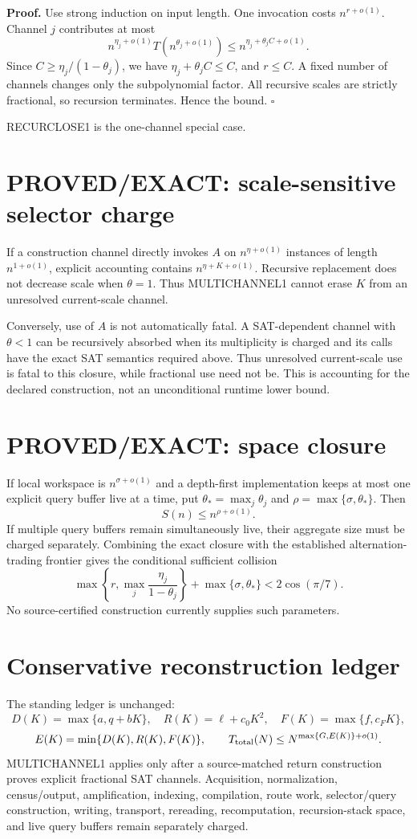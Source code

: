 \documentclass[11pt]{article}
\begin{document}
\textbf{Proof.}
Use strong induction on input length. One invocation costs \(n^{r+o(1)}\). Channel \(j\) contributes at most
\[
n^{\eta_j+o(1)}T(n^{\theta_j+o(1)})\le n^{\eta_j+\theta_j C+o(1)}.
\]
Since \(C\ge\eta_j/(1-\theta_j)\), we have \(\eta_j+\theta_jC\le C\), and \(r\le C\). A fixed number of channels changes only the subpolynomial factor. All recursive scales are strictly fractional, so recursion terminates. Hence the bound. \(\square\)

RECURCLOSE1 is the one-channel special case.

\section*{PROVED/EXACT: scale-sensitive selector charge}
If a construction channel directly invokes \(A\) on \(n^{\eta+o(1)}\) instances of length \(n^{1+o(1)}\), explicit accounting contains \(n^{\eta+K+o(1)}\). Recursive replacement does not decrease scale when \(\theta=1\). Thus MULTICHANNEL1 cannot erase \(K\) from an unresolved current-scale channel.

Conversely, use of \(A\) is not automatically fatal. A SAT-dependent channel with \(\theta<1\) can be recursively absorbed when its multiplicity is charged and its calls have the exact SAT semantics required above. Thus unresolved current-scale use is fatal to this closure, while fractional use need not be. This is accounting for the declared construction, not an unconditional runtime lower bound.

\section*{PROVED/EXACT: space closure}
If local workspace is \(n^{\sigma+o(1)}\) and a depth-first implementation keeps at most one explicit query buffer live at a time, put \(\theta_*=\max_j\theta_j\) and \(\rho=\max\{\sigma,\theta_*\}\). Then
\[
\boxed{S(n)\le n^{\rho+o(1)}}.
\]
If multiple query buffers remain simultaneously live, their aggregate size must be charged separately. Combining the exact closure with the established alternation-trading frontier gives the conditional sufficient collision
\[
\boxed{\max\left\{r,\max_j\frac{\eta_j}{1-\theta_j}\right\}+\max\{\sigma,\theta_*\}<2\cos(\pi/7).}
\]
No source-certified construction currently supplies such parameters.

\section*{Conservative reconstruction ledger}
The standing ledger is unchanged:
\[
D(K)=\max\{a,q+bK\},\quad R(K)=\ell+c_0K^2,\quad F(K)=\max\{f,c_FK\},
\]
\[
E(K)=\min\{D(K),R(K),F(K)\},\qquad T_{\rm total}(N)\le N^{\max\{G,E(K)\}+o(1)}.
\]
MULTICHANNEL1 applies only after a source-matched return construction proves explicit fractional SAT channels. Acquisition, normalization, census/output, amplification, indexing, compilation, route work, selector/query construction, writing, transport, rereading, recomputation, recursion-stack space, and live query buffers remain separately charged.
\end{document}
